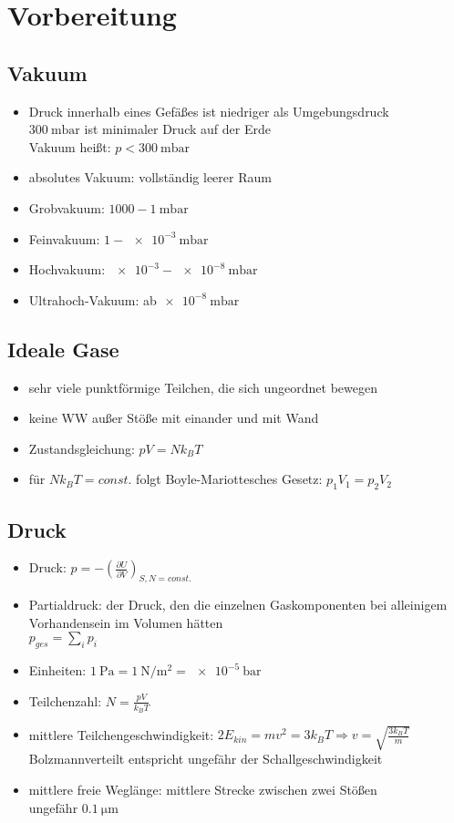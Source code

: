 \section{Vorbereitung}
\subsection{Vakuum}
\begin{itemize}
    \item Druck innerhalb eines Gefäßes ist niedriger als Umgebungsdruck\\
    \to $\SI{300}{\milli\bar}$ ist minimaler Druck auf der Erde\\
    \to Vakuum heißt: $p<\SI{300}{\milli\bar}$
    \item absolutes Vakuum: vollständig leerer Raum
    \item Grobvakuum: $\num{1000}-\SI{1}{\milli\bar}$
    \item Feinvakuum: $\num{1}-\SI{e-3}{\milli\bar}$
    \item Hochvakuum: $\num{e-3}-\SI{e-8}{\milli\bar}$
    \item Ultrahoch-Vakuum: ab$\SI{e-8}{\milli\bar}$
\end{itemize}
\subsection{Ideale Gase}
\begin{itemize}
    \item sehr viele punktförmige Teilchen, die sich ungeordnet bewegen
    \item keine WW außer Stöße mit einander und mit Wand
    \item Zustandsgleichung: $pV=Nk_BT$
    \item für $Nk_BT=const.$ folgt Boyle-Mariottesches Gesetz: $p_1V_1=p_2V_2$
\end{itemize}

\subsection{Druck}
\begin{itemize}
    \item Druck: $p=-\left(\frac{\partial U}{\partial V}\right)_{S,N=const.}$
    \item Partialdruck: der Druck, den die einzelnen Gaskomponenten bei alleinigem Vorhandensein im Volumen hätten\\
    \to $p_{ges}=\sum_i p_i$ 
    \item Einheiten: $\SI{1}{\pascal}=\SI{1}{\newton\per\square\metre}=\SI{e-5}{\bar}$
    \item Teilchenzahl: $N=\frac{pV}{k_BT}$
    \item mittlere Teilchengeschwindigkeit: $2E_{kin}=mv^2=3k_BT\Rightarrow v=\sqrt{\frac{3k_BT}{m}}$\\
    \to Bolzmannverteilt
    \to entspricht ungefähr der Schallgeschwindigkeit
    \item mittlere freie Weglänge: mittlere Strecke zwischen zwei Stößen\\
    \to ungefähr $\SI{0.1}{\micro\metre}$
\end{itemize}

